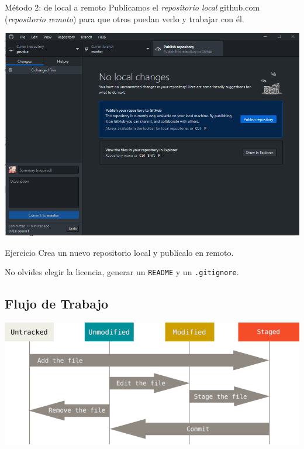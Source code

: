 \documentclass[aspectratio=169, xcolor={usenames,svgnames,dvipsnames}]{beamer}
\begin{document}
\begin{frame}[label={sec:org34a23f0}]{Método 2: de local a remoto}
Publicamos el \emph{repositorio local} github.com (\emph{repositorio remoto}) para que otros puedan verlo y trabajar con él.

\begin{center}
\includegraphics[width=.9\linewidth]{figs/Desktop_PublishRepository.png}
\end{center}
\end{frame}

\begin{frame}[label={sec:org0b0a443},fragile]{}
 \begin{block}{Ejercicio}
Crea un nuevo repositorio local y publícalo en remoto. 

No olvides elegir la licencia, generar un \texttt{README} y un \texttt{.gitignore}.
\end{block}
\end{frame}
\subsection{Flujo de Trabajo}
\label{sec:org6d016f2}
\begin{frame}[label={sec:org5d8b99a}]{}
\begin{center}
\includegraphics[width=.9\linewidth]{figs/git_estados.png}
\end{center}
\end{frame}
\end{document}
